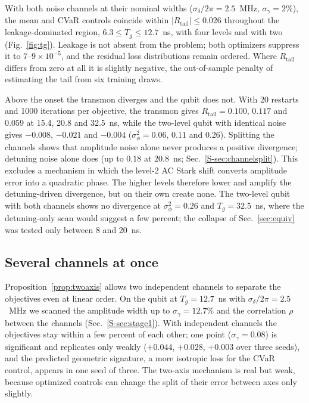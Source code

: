 \documentclass[aps,pra,twocolumn,superscriptaddress,reprint,nofootinbib,floatfix]{revtex4-2}
\theoremstyle{definition}
\newcommand{\Rt}{R_{\mathrm{tail}}}
\newcommand{\sref}[1]{Sec.~\ref{S-#1}}
\begin{document}
With both noise channels at their nominal widths
($\sigma_\delta/2\pi=2.5$~MHz, $\sigma_\gamma=2\%$), the mean and CVaR
controls coincide within $|\Rt|\le0.026$ throughout the leakage-dominated
region, $6.3\le T_g\le12.7$~ns, with four levels and with two
(Fig.~\ref{fig:tg}). Leakage is not absent from the problem; both
optimizers suppress it to $7$--$9\times10^{-5}$, and the residual loss
distributions remain ordered. Where $\Rt$ differs from zero at all it is
slightly negative, the out-of-sample penalty of estimating the tail from six
training draws.

Above the onset the transmon diverges and the qubit does not. With 20
restarts and 1000 iterations per objective, the transmon gives
$\Rt=0.100$, $0.117$ and $0.059$ at 15.4, 20.8 and 32.5~ns, while the
two-level qubit with identical noise gives $-0.008$, $-0.021$ and $-0.004$
($\sigma_\phi^2=0.06$, $0.11$ and $0.26$). Splitting the channels shows that
amplitude noise alone never produces a positive divergence; detuning noise
alone does (up to $0.18$ at 20.8~ns; \sref{sec:channelsplit}). This excludes
a mechanism in which the level-2 AC Stark shift converts amplitude error into
a quadratic phase. The higher levels therefore lower and amplify the
detuning-driven divergence, but on their own create none. The two-level
qubit with both channels shows no divergence at $\sigma_\phi^2=0.26$ and
$T_g=32.5$~ns, where the detuning-only scan would suggest a few percent; the
collapse of Sec.~\ref{sec:equiv} was tested only between 8 and 20~ns.

\subsection{Several channels at once}
\label{sec:channels}

Proposition~\ref{prop:twoaxis} allows two independent channels to separate
the objectives even at linear order. On the qubit at $T_g=12.7$~ns with
$\sigma_\delta/2\pi=2.5$~MHz we scanned the amplitude width up to
$\sigma_\gamma=12.7\%$ and the correlation $\rho$ between the channels
(\sref{sec:stage1}). With independent channels the objectives stay within a
few percent of each other; one point ($\sigma_\gamma=0.08$) is significant
and replicates only weakly ($+0.044$, $+0.028$, $+0.003$ over three seeds),
and the predicted geometric signature, a more isotropic loss for the CVaR
control, appears in one seed of three. The two-axis mechanism is real but
weak, because optimized controls can change the split of their error between
axes only slightly.
\end{document}
